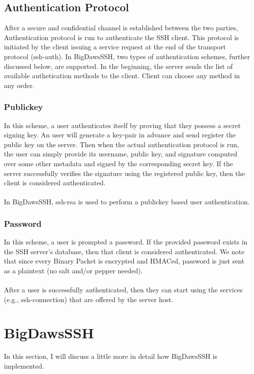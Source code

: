 \documentclass[10pt,sigconf]{acmart}
\begin{document}
\subsection{Authentication Protocol}

After a secure and confidential channel is established between the two parties, Authentication protocol is run to authenticate the SSH client. This protocol is initiated by the client issuing a service request at the end of the transport protocol (ssh-auth). In BigDawsSSH, two types of authentication schemes, further discussed below, are supported. In the beginning, the server sends the list of available authetication methods to the client. Client can choose any method in any order.
\subsubsection{Publickey}
In this scheme, a user authenticates itself by proving that they possess a secret signing key. An user will generate a key-pair in advance and send register the public key on the server. Then when the actual authentication protocol is run, the user can simply provide its username, public key, and signature computed over some other metadata and signed by the corresponding secret key. If the server successfully verifies the signature using the registered public key, then the client is considered authenticated. \\\\
In BigDawsSSH, ssh-rsa is used to perform a publickey based user authentication.
\subsubsection{Password}
In this scheme, a user is prompted a password. If the provided password exists in the SSH server's database, then that client is considered authenticated. We note that since every Binary Packet is encrypted and HMACed, password is just sent as a plaintext (no salt and/or pepper needed). \\\\
After a user is successfully authenticated, then they can start using the services (e.g., ssh-connection) that are offered by the server host.
\section{BigDawsSSH}
In this section, I will discuss a little more in detail how BigDawsSSH is implemented.
\end{document}
